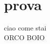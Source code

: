 \documentclass{article}
\begin{document}
    \section{prova}
        ciao come stai\\
        ORCO BOIO
\end{document}
